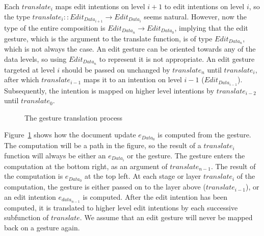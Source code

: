 \documentclass[twoside,epsf]{report}
\begin{document}
Each $translate_i$ maps edit intentions on level $i+1$ to edit intentions on level $i$, so the type $translate_i :: Edit_{Data_{i+1}} \rightarrow Edit_{Data_i}$ seems natural. However, now the type of the entire composition is $Edit_{Data_n} \rightarrow Edit_{Data_0}$, implying that the edit gesture, which is the argument to the translate function, is of type $Edit_{Data_n}$, which is not always the case. An edit gesture can be oriented towards any of the data levels, so using $Edit_{Data_n}$ to represent it is not appropriate. An edit gesture targeted at level $i$ should be passed on unchanged by $translate_n$ until $translate_{i}$, after which $translate_{i-1}$ maps it to an intention on level $i-1$ ($Edit_{Data_{i-1}}$). Subsequently, the intention is mapped on higher level intentions by $translate_{i-2}$ until $translate_0$. 
\begin{figure}
\begin{small}
\begin{center}
\begin{center}
\begin{small}
\bigskip \noindent
{}
\end{small}
\end{center}\caption{The gesture translation process }\label{translate} 
\end{center}
\end{small}
\end{figure}


Figure~\ref{translate} shows how the document update $e_{Data_0}$ is computed from the gesture. The computation will be a path in the figure, so the result of a $translate_i$ function will always be either an $e_{Data_i}$ or the gesture. The gesture enters the computation at the bottom right, as an argument of $translate_{n-1}$. The result of the computation is $e_{Data_0}$ at the top left. At each stage or layer $translate_i$ of the computation, the gesture is either passed on to the layer above ($translate_{i-1}$), or an edit intention $e_{data_{n-1}}$ is computed. After the edit intention has been computed, it is translated to higher level edit intentions by each successive subfunction of $translate$. We assume that an edit gesture will never be mapped back on a gesture again.
\end{document}
